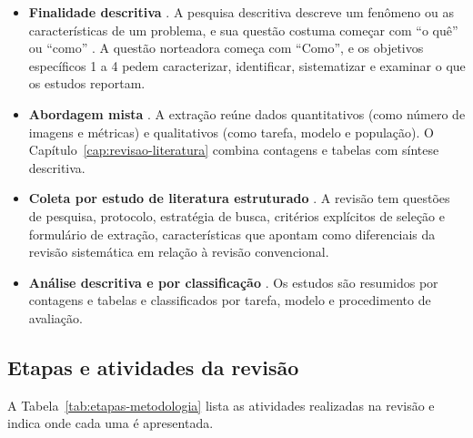 \begin{itemize}
\item \textbf{Finalidade descritiva} \cite[p.~11--13]{wohlin2024}. A pesquisa
descritiva descreve um fenômeno ou as características de um problema, e sua
questão costuma começar com ``o quê'' ou ``como'' \cite[p.~12]{wohlin2024}.
A questão norteadora começa com ``Como'', e os objetivos específicos 1 a 4
pedem caracterizar, identificar, sistematizar e examinar o que os estudos
reportam.

\item \textbf{Abordagem mista} \cite[p.~13]{wohlin2024}. A extração reúne
dados quantitativos (como número de imagens e métricas) e qualitativos (como
tarefa, modelo e população). O Capítulo~\ref{cap:revisao-literatura} combina
contagens e tabelas com síntese descritiva.

\item \textbf{Coleta por estudo de literatura estruturado}
\cite[p.~16--17]{wohlin2024}. A revisão tem questões de pesquisa, protocolo,
estratégia de busca, critérios explícitos de seleção e formulário de extração,
características que  apontam como diferenciais
da revisão sistemática em relação à revisão convencional.

\item \textbf{Análise descritiva e por classificação}
\cite[p.~18]{wohlin2024}. Os estudos são resumidos por contagens e tabelas e
classificados por tarefa, modelo e procedimento de avaliação.
\end{itemize}

\subsection{Etapas e atividades da revisão}

A Tabela~\ref{tab:etapas-metodologia} lista as atividades realizadas na revisão
e indica onde cada uma é apresentada.

